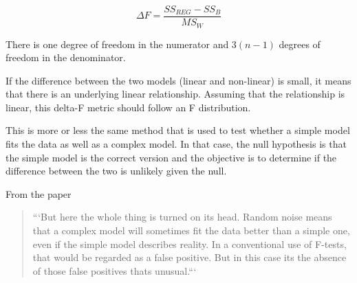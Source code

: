 \documentclass[12pt, a4paper, oneside]{article}\usepackage{graphicx, color}
\begin{document}
\begin{equation}
\Delta F = \frac{SS_{REG} - SS_B}{MS_W}
\end{equation}

There is one degree of freedom in the numerator and $3(n-1)$ degrees of freedom in the denominator. 

If the difference between the two models (linear and non-linear) is small, it means that there is an underlying linear relationship. Assuming that the relationship is linear, this delta-F metric should follow an F distribution. 

This is more or less the same method that is used to test whether a simple model fits the data as well as a complex model. In that case, the null hypothesis is that the simple model is the correct version and the objective is to determine if the difference between the two is unlikely given the null. 

From the paper

\begin{quotation}
```But here the whole thing is turned on its head. Random noise means that a complex model will sometimes fit the data better than a simple one, even if the simple model describes reality. In a conventional use of F-tests, that would be regarded as a false positive. But in this case its the absence of those false positives thats unusual.```
\end{quotation}
\end{document}
